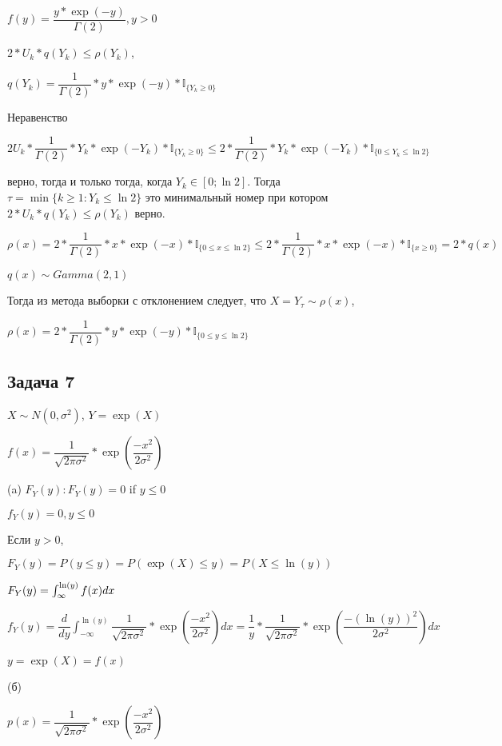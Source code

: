 \documentclass[a4paper,12pt]{article} %
\begin{document}
$f(y) = \dfrac{y*\exp(-y) }{\Gamma(2) }, y>0  $

$2*U_k * q(Y_k) \leq \rho(Y_k)$, 

$q(Y_k) = \dfrac{1}{\Gamma(2)} * y*\exp(-y)  *  \mathbb{I}_{\{Y_k \geq 0 \}} $

Неравенство

$2U_k  * \dfrac{1}{\Gamma(2)} * Y_k*\exp(-Y_k)  *  \mathbb{I}_{\{Y_k \geq 0 \}} \leq  2* \dfrac{1}{\Gamma(2)}  * Y_k *  \exp(-Y_k)  *  \mathbb{I}_{\{ 0\leq Y_k  \leq  \ln 2 \}}$

верно, тогда и только тогда, когда $Y_k \in [0;\ln2]$.
Тогда $\tau = \min \{ k\geq 1: Y_k \leq \ln 2 \} $  это минимальный номер при котором $2*U_k * q(Y_k) \leq \rho(Y_k)$ верно. 


$\rho(x) =2* \dfrac{1}{\Gamma(2)}  * x *  \exp(-x)  *  \mathbb{I}_{\{ 0\leq x\leq \ln 2 \}}  \leq    2* \dfrac{1}{\Gamma(2)}  * x *  \exp(-x)  *  \mathbb{I}_{\{  x\geq 0 \}} = 2* q(x)$

$q(x) \sim Gamma(2,1) $
 

Тогда из метода выборки с отклонением следует, что $X=Y_{\tau} \sim \rho(x)$,

$\rho(x) =  2* \dfrac{1}{\Gamma(2)}  * y *  \exp(-y)  *  \mathbb{I}_{\{ 0\leq y \leq \ln 2 \}}  $






\subsection*{Задача 7}

$X\sim N(0,\sigma^2)$, $Y = \exp(X)$

$f(x) = \dfrac{1}{\sqrt{2\pi \sigma^2}} *\exp(\dfrac{-x^2}{2\sigma^2})$

(a) $F_Y(y): F_Y(y) = 0$ if $y\leq0$

$f_Y(y) = 0, y\leq 0$

Если  $y>0$, 

$F_Y(y) = P(y\leq y ) = P(\exp(X) \leq y )  = P(X \leq \ln(y) ) $
 
$F_Y(y) = \int_{\-\infty}^{\ln(y)} f(x)dx $


$f_Y(y) = \dfrac{d}{dy} \int_{-\infty}^{\ln(y)} \dfrac{1}{\sqrt{2\pi \sigma^2}} *\exp(\dfrac{-x^2}{2\sigma^2})dx =\dfrac{1}{y} * \dfrac{1}{\sqrt{2\pi \sigma^2}} *\exp(\dfrac{-(\ln( y))^2}{2\sigma^2})dx 
$

$y=\exp(X)=f(x)$

(б)

$p(x) = \dfrac{1}{\sqrt{2\pi \sigma^2}} *\exp(\dfrac{-x^2}{2\sigma^2})$
\end{document}
